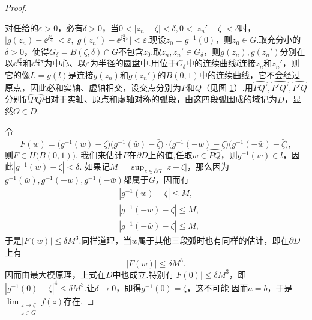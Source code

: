 \begin{proof}
\begin{figure}[!ht]
{
}
\caption{\label{fig7.2}}
\end{figure}
对任给的$\varepsilon>0$，必有$\delta>0$，当$0<|z_n-\zeta|<\delta,0<|z_n'-\zeta|<\delta $时，$\big|g(z_n)-\ee^{\ii\frac\pi4}\big|<\varepsilon,\big|g(z_n')-\ee^{\ii\frac54\pi}\big|
<\varepsilon$.现设$z_0=g^{-1}(0)$，则$z_0\in G$.取充分小的$\delta>0$，使得$G_\delta=B(\zeta,\delta)\cap G$不包含$z_0$.取$z_n,z_n'\in G_\delta$，则$g(z_n),g(z_n')$分别在以$\ee^{\ii\frac\pi4}$和$\ee^{\ii\frac54\pi}$为中心、以$\varepsilon$为半径的圆盘中.用位于$G_\delta$中的连续曲线$l$连接$z_n$和$z_n'$，则它的像$L=g(l)$是连接$g(z_n)$和$g(z_n')$的$B(0,1)$中的连续曲线，它不会经过原点，因此必和实轴、虚轴相交，设交点分别为$P$和$Q$（见图 \ref{fig7.2}）.用$\wideparen{PQ'},\wideparen{P'Q'},\wideparen{P'Q}$分别记$\wideparen{PQ}$相对于实轴、原点和虚轴对称的弧段，由这四段弧围成的域记为$D$，显然$O\in D$.

令
\[F(w)=\big(g^{-1}(w)-\zeta\big)\big(\bar{g^{-1}(\bar w)}-\bar \zeta\big)
\cdot\big(g^{-1}(-w)-\zeta\big)\big(\bar{g^{-1}(-\bar w)}-\bar \zeta\big),\]
则$F\in H\big(B(0,1)\big)$. 我们来估计$F$在$\partial D$上的值,任取$w\in\wideparen{PQ}$，则$g^{-1}(w)\in l$，因此$|g^{-1}(w)-\zeta|<\delta$. 如果记$M=\sup_{z\in\partial G}|z-\zeta|$，那么因为$g^{-1}(\bar w),g^{-1}(-w),g^{-1}(-\bar w)$都属于$G$，因而有
\begin{align*}
&|g^{-1}(\bar w)-\zeta|\le M,\\
&|g^{-1}(-w)-\zeta|\le M,\\
&|g^{-1}(-\bar w)-\zeta|\le M,
\end{align*}
于是$|F(w)|\le \delta M^3$.同样道理，当$w$属于其他三段弧时也有同样的估计，即在$\partial D$上有
\[|F(w)|\le\delta M^3.\]
因而由最大模原理，上式在$D$中也成立.特别有$|F(0)|\le\delta M^3$，即$|g^{-1}(0)-\zeta|^4\le\delta M^3$.让$\delta\to0$，即得$g^{-1}(0)=\zeta$，这不可能.因而$a=b$，于是$\lim_{\substack{z\to\zeta\\z\in G}}f(z)$存在.


\end{proof}
